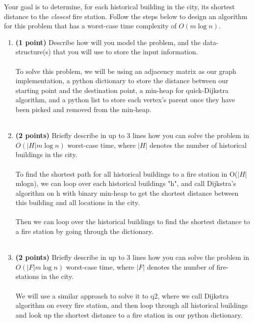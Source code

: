 \documentclass{assignment-373}
\begin{document}
Your goal is to determine, for each historical building in the city,
its shortest distance to the \emph{closest} fire station.
%
Follow the steps below to design an algorithm for this problem that
has a worst-case time complexity of $O(m \log n).$
%
\begin{enumerate}
\item \textbf{(1 point)} Describe how will you model the problem, and
  the data-structure(s) that you will use to store the input
  information.
  \\\\
  \phantom{=} \phantom{=} To solve this problem, we will be using an adjacency matrix as our graph implementation, a python dictionary to store the distance between our starting point and the destination point, a min-heap for quick-Dijkstra algorithm, and a python list to store each vertex's parent once they have been picked and removed from the min-heap.\\
  \\

\item \textbf{(2 points)} Briefly describe in up to 3 lines how you
  can solve the problem in $O\left(|H|m \log n\right)$ worst-case
  time, where $|H|$ denotes the number of historical buildings in the
  city.\\\\
  \phantom{=} \phantom{=} To find the shortest path for all historical buildings to a fire station in O($|H|$mlogn), we can loop over each historical buildings "h", and call Dijkstra's algorithm on h with binary min-heap to get the shortest distance between this building and all locations in the city.\\
  \\
  Then we can loop over the historical buildings to find the shortest distance to a fire station by going through the dictionary.\\\\
\item \textbf{(2 points)} Briefly describe in up to 3 lines how you
  can solve the problem in $O\left(|F|m \log n\right)$ worst-case
  time, where $|F|$ denotes the number of fire-stations in the city.
  \\\\
  \phantom{=} \phantom{=} We will use a similar approach to solve it to q2, where we call Dijkstra algorithm on every fire station, and then loop through all historical buildings and look up the shortest distance to a fire station in our python dictionary.\\\\
  

\end{enumerate}
\end{document}
